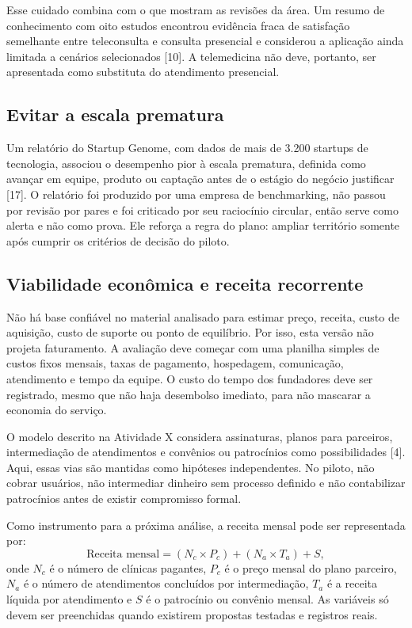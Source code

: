 \documentclass[12pt,a4paper]{article}
\begin{document}
Esse cuidado combina com o que mostram as revisões da área. Um resumo de conhecimento com oito estudos encontrou evidência fraca de satisfação semelhante entre teleconsulta e consulta presencial e considerou a aplicação ainda limitada a cenários selecionados [10]. A telemedicina não deve, portanto, ser apresentada como substituta do atendimento presencial.

\subsection{Evitar a escala prematura}

Um relatório do Startup Genome, com dados de mais de 3.200 startups de tecnologia, associou o desempenho pior à escala prematura, definida como avançar em equipe, produto ou captação antes de o estágio do negócio justificar [17]. O relatório foi produzido por uma empresa de benchmarking, não passou por revisão por pares e foi criticado por seu raciocínio circular, então serve como alerta e não como prova. Ele reforça a regra do plano: ampliar território somente após cumprir os critérios de decisão do piloto.

\subsection{Viabilidade econômica e receita recorrente}

Não há base confiável no material analisado para estimar preço, receita, custo de aquisição, custo de suporte ou ponto de equilíbrio. Por isso, esta versão não projeta faturamento. A avaliação deve começar com uma planilha simples de custos fixos mensais, taxas de pagamento, hospedagem, comunicação, atendimento e tempo da equipe. O custo do tempo dos fundadores deve ser registrado, mesmo que não haja desembolso imediato, para não mascarar a economia do serviço.

O modelo descrito na Atividade X considera assinaturas, planos para parceiros, intermediação de atendimentos e convênios ou patrocínios como possibilidades [4]. Aqui, essas vias são mantidas como hipóteses independentes. No piloto, não cobrar usuários, não intermediar dinheiro sem processo definido e não contabilizar patrocínios antes de existir compromisso formal.

Como instrumento para a próxima análise, a receita mensal pode ser representada por:
\[
\text{Receita mensal} = (N_c \times P_c) + (N_a \times T_a) + S,
\]
onde $N_c$ é o número de clínicas pagantes, $P_c$ é o preço mensal do plano parceiro, $N_a$ é o número de atendimentos concluídos por intermediação, $T_a$ é a receita líquida por atendimento e $S$ é o patrocínio ou convênio mensal. As variáveis só devem ser preenchidas quando existirem propostas testadas e registros reais.
\end{document}
